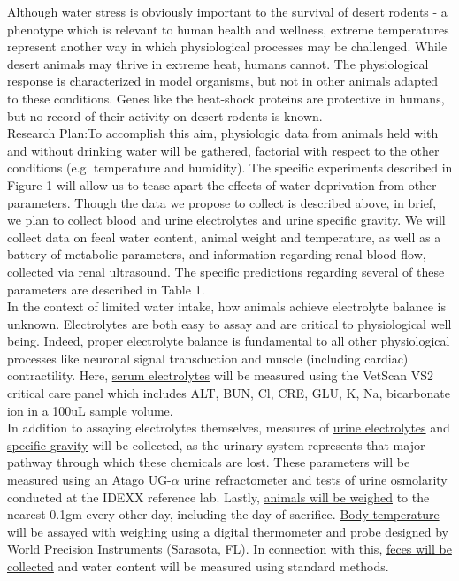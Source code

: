 \documentclass[11pt]{article}
\begin{document}
Although water stress is obviously important to the survival of desert rodents - a phenotype which is relevant to human health and wellness, extreme temperatures represent another way in which physiological processes may be challenged. While desert animals may thrive in extreme heat, humans cannot. The physiological response is characterized in model organisms, but not in other animals adapted to these conditions. Genes like the heat-shock proteins are protective in humans, but no record of their activity on desert rodents is known. \\

Research Plan:To accomplish this aim, physiologic data from animals held with and without drinking water will be gathered, factorial with respect to the other conditions (e.g. temperature and humidity). The specific experiments described in \hypertarget{Figure 1}{Figure 1} will allow us to tease apart the effects of water deprivation from other parameters. Though the data we propose to collect is described above, in brief, we plan to collect blood and urine electrolytes and urine specific gravity. We will collect data on fecal water content, animal weight and temperature, as well as a battery of metabolic parameters, and information regarding renal blood flow, collected via renal ultrasound. The specific predictions regarding several of these parameters are described in Table 1.  \\

In the context of limited water intake, how animals achieve electrolyte balance is unknown. Electrolytes are both easy to assay and are critical to physiological well being. Indeed, proper electrolyte balance is fundamental to all other physiological processes like neuronal signal transduction and muscle (including cardiac) contractility. Here, \ul{serum electrolytes} will be measured using the VetScan VS2 critical care panel which includes ALT, BUN, Cl, CRE, GLU, K, Na, bicarbonate ion in a 100uL sample volume. \\

In addition to assaying electrolytes themselves, measures of \ul{urine electrolytes} and \ul{specific gravity} will be collected, as the urinary system represents that major pathway through which these chemicals are lost. These parameters will be measured using an Atago UG-$\alpha$ urine refractometer and tests of urine osmolarity conducted at the IDEXX reference lab. Lastly, \ul{animals will be weighed} to the nearest 0.1gm every other day, including the day of sacrifice. \ul{Body temperature} will be assayed with weighing using a digital thermometer and probe designed by World Precision Instruments (Sarasota, FL). In connection with this, \ul{feces will be collected} and water content will be measured using standard methods. \\
\end{document}
